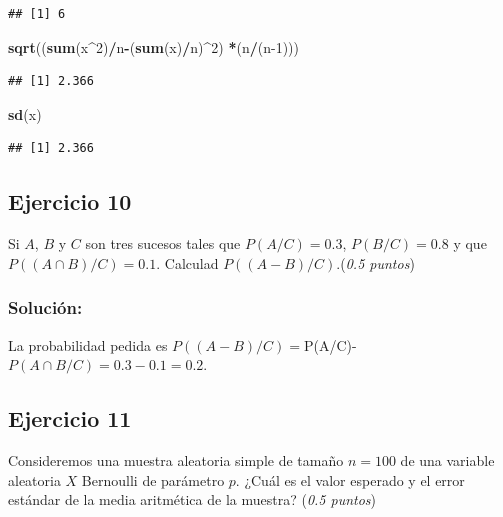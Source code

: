 \documentclass[]{article}
\newenvironment{Shaded}{\begin{snugshade}}{\end{snugshade}}
\newcommand{\DecValTok}[1]{\textcolor[rgb]{0.00,0.00,0.81}{#1}}
\newcommand{\KeywordTok}[1]{\textcolor[rgb]{0.13,0.29,0.53}{\textbf{#1}}}
\newcommand{\NormalTok}[1]{#1}
\newcommand{\OperatorTok}[1]{\textcolor[rgb]{0.81,0.36,0.00}{\textbf{#1}}}
\begin{document}
\begin{verbatim}
## [1] 6
\end{verbatim}

\begin{Shaded}
\begin{Highlighting}[]
\KeywordTok{sqrt}\NormalTok{((}\KeywordTok{sum}\NormalTok{(x}\OperatorTok{^}\DecValTok{2}\NormalTok{)}\OperatorTok{/}\NormalTok{n}\OperatorTok{-}\NormalTok{(}\KeywordTok{sum}\NormalTok{(x)}\OperatorTok{/}\NormalTok{n)}\OperatorTok{^}\DecValTok{2}\NormalTok{) }\OperatorTok{*}\NormalTok{(n}\OperatorTok{/}\NormalTok{(n}\DecValTok{-1}\NormalTok{)))}
\end{Highlighting}
\end{Shaded}

\begin{verbatim}
## [1] 2.366
\end{verbatim}

\begin{Shaded}
\begin{Highlighting}[]
\KeywordTok{sd}\NormalTok{(x)}
\end{Highlighting}
\end{Shaded}

\begin{verbatim}
## [1] 2.366
\end{verbatim}

\hypertarget{ejercicio-10}{%
\subsection{Ejercicio 10}\label{ejercicio-10}}

Si \(A\), \(B\) y \(C\) son tres sucesos tales que \(P(A/C)= 0.3\),
\(P(B/C)=0.8\) y que \(P((A\cap B)/C)=0.1\). Calculad
\(P((A-B)/C)\).(\emph{0.5 puntos})

\hypertarget{soluciuxf3n-9}{%
\subsubsection{Solución:}\label{soluciuxf3n-9}}

La probabilidad pedida es
\(P((A-B)/C)=\)P(A/C)-\(P(A\cap B/C)=0.3-0.1=0.2.\)

\hypertarget{ejercicio-11}{%
\subsection{Ejercicio 11}\label{ejercicio-11}}

Consideremos una muestra aleatoria simple de tamaño \(n=100\) de una
variable aleatoria \(X\) Bernoulli de parámetro \(p\). ¿Cuál es el valor
esperado y el error estándar de la media aritmética de la muestra?
(\emph{0.5 puntos})
\end{document}
